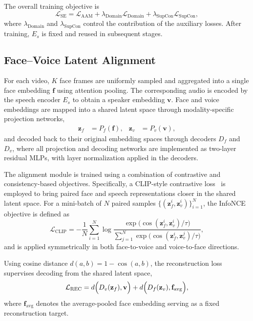 \documentclass[cameraready]{Interspeech}
\begin{document}
The overall training objective is
\begin{equation}
\mathcal{L}_{\mathrm{SE}}
=
\mathcal{L}_{\mathrm{AAM}}
+
\lambda_{\mathrm{Domain}} \mathcal{L}_{\mathrm{Domain}}
+
\lambda_{\mathrm{SupCon}} \mathcal{L}_{\mathrm{SupCon}},
\end{equation}
where $\lambda_{\mathrm{Domain}}$ and $\lambda_{\mathrm{SupCon}}$ control the contribution of the auxiliary losses. After training, $E_s$ is fixed and reused in subsequent stages.

\subsection{Face--Voice Latent Alignment}

For each video, $K$ face frames are uniformly sampled and aggregated into a single face embedding $\mathbf{f}$ using attention pooling. The corresponding audio is encoded by the speech encoder $E_s$ to obtain a speaker embedding $\mathbf{v}$. Face and voice embeddings are mapped into a shared latent space through modality-specific projection networks,
\begin{align}
\mathbf{z}_f &= P_f(\mathbf{f}), &
\mathbf{z}_v &= P_v(\mathbf{v}),
\end{align}
and decoded back to their original embedding spaces through decoders $D_f$ and $D_v$, where all projection and decoding networks are implemented as two-layer residual MLPs, with layer normalization applied in the decoders.

The alignment module is trained using a combination of contrastive and consistency-based objectives.
Specifically, a CLIP-style contrastive loss~\cite{pmlr-v139-radford21a} is employed to bring paired face and speech representations closer in the shared latent space.
For a mini-batch of $N$ paired samples $\{(\mathbf{z}_f^i,\mathbf{z}_v^i)\}_{i=1}^{N}$, the InfoNCE objective is defined as
\begin{equation}
\mathcal{L}_{\mathrm{CLIP}}
=
-\frac{1}{N}
\sum_{i=1}^{N}
\log
\frac{
\exp\bigl(\cos(\mathbf{z}_f^i,\mathbf{z}_v^i)/\tau\bigr)
}{
\sum_{j=1}^{N}
\exp\bigl(\cos(\mathbf{z}_f^i,\mathbf{z}_v^j)/\tau\bigr)
},
\end{equation}
and is applied symmetrically in both face-to-voice and voice-to-face directions.

Using cosine distance $d(a,b)=1-\cos(a,b)$, the reconstruction loss supervises decoding from the shared latent space,
\begin{equation}
\mathcal{L}_{\mathrm{REC}}
=
d\Bigl(D_v(\mathbf{z}_f), \mathbf{v}\Bigr)
+
d\Bigl(D_f(\mathbf{z}_v), \mathbf{f}_{\mathrm{avg}}\Bigr),
\end{equation}
where $\mathbf{f}_{\mathrm{avg}}$ denotes the average-pooled face embedding serving as a fixed reconstruction target.
\end{document}
